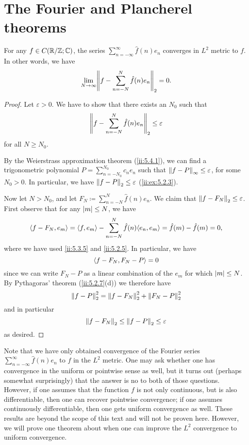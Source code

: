 \section{The Fourier and Plancherel theorems}\label{ii:sec:5.5}

\begin{thm}\label{ii:5.5.1}
  For any \(f \in C(\R / \Z ; \C)\), the series \(\sum_{n = -\infty}^\infty \hat{f}(n) e_n\) converges in \(L^2\) metric to \(f\).
  In other words, we have
  \[
    \lim_{N \to \infty} \norm*{f - \sum_{n = -N}^N \hat{f}(n) e_n}_2 = 0.
  \]
\end{thm}

\begin{proof}
  Let \(\varepsilon > 0\).
  We have to show that there exists an \(N_0\) such that
  \[
    \norm*{f - \sum_{n = -N}^N \hat{f}(n) e_n}_2 \leq \varepsilon
  \]
  for all \(N \geq N_0\).

  By the Weierstrass approximation theorem (\cref{ii:5.4.1}), we can find a trigonometric polynomial \(P = \sum_{n = -N_0}^{N_0} c_n e_n\) such that \(\norm*{f - P}_{\infty} \leq \varepsilon\), for some \(N_0 > 0\).
  In particular, we have \(\norm*{f - P}_2 \leq \varepsilon\) (\cref{ii:ex:5.2.3}).

  Now let \(N > N_0\), and let \(F_N \coloneqq \sum_{n = -N}^N \hat{f}(n) e_n\).
  We claim that \(\norm*{f - F_N}_2 \leq \varepsilon\).
  First observe that for any \(\abs{m} \leq N\), we have
  \[
    \inner*{f - F_N, e_m} = \inner*{f, e_m} - \sum_{n = -N}^N \hat{f}(n) \inner*{e_n, e_m} = \hat{f}(m) - \hat{f}(m) = 0,
  \]
  where we have used \cref{ii:5.3.5} and \cref{ii:5.2.5}.
  In particular, we have
  \[
    \inner*{f - F_N, F_N - P} = 0
  \]
  since we can write \(F_N - P\) as a linear combination of the \(e_m\) for which \(\abs{m} \leq N\).
  By Pythagoras' theorem (\cref{ii:5.2.7}(d)) we therefore have
  \[
    \norm*{f - P}_2^2 = \norm*{f - F_N}_2^2 + \norm*{F_N - P}_2^2
  \]
  and in particular
  \[
    \norm*{f - F_N}_2 \leq \norm*{f - P}_2 \leq \varepsilon
  \]
  as desired.
\end{proof}

\begin{rmk}\label{ii:5.5.2}
  Note that we have only obtained convergence of the Fourier series \(\sum_{n = -\infty}^\infty \hat{f}(n) e_n\) to \(f\) in the \(L^2\) metric.
  One may ask whether one has convergence in the uniform or pointwise sense as well, but it turns out (perhaps somewhat surprisingly) that the answer is no to both of those questions.
  However, if one assumes that the function \(f\) is not only continuous, but is also differentiable, then one can recover pointwise convergence;
  if one assumes continuously differentiable, then one gets uniform convergence as well.
  These results are beyond the scope of this text and will not be proven here.
  However, we will prove one theorem about when one can improve the \(L^2\) convergence to uniform convergence.
\end{rmk}

